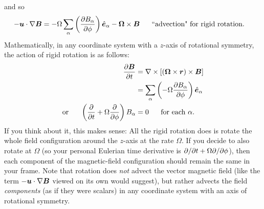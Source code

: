 \documentclass[12pt]{article}
\newcommand{\vecrot}{\bm{\Omega}}
\newcommand{\vecr}{\bm{r}}
\begin{document}
and so
\begin{align}
	-\vecu\dotgrad\vecb &= -\Omega\sum_\alpha\left(\pderiv{B_\alpha}{\phi}\right)\e_\alpha-\vecrot\times\vecb \five \text{``advection" for rigid rotation}.
\end{align}
Mathematically, in any coordinate system with a $z$-axis of rotational symmetry, the action of rigid rotation is as follows:
\begin{subequations}
\begin{align}
	\pderiv{\vecb}{t}&=\curl[(\vecrot\times\vecr)\times\vecb]\nonumber\\
	&= \sum_\alpha\left(-\Omega\pderiv{B_\alpha}{\phi}\right)\e_\alpha \label{eq:rottransport1}\\
	\orr \left(\pderiv{}{t}+\Omega\pderiv{}{\phi}\right)B_\alpha&=0\five\text{for each $\alpha$}.\label{eq:rottransport2}
\end{align}
\end{subequations}
If you think about it, this makes sense: All the rigid rotation does is rotate the whole field configuration around the $z$-axis at the rate $\Omega$. If you decide to also rotate at $\Omega$ (so your personal Eulerian time derivative is $\partial/\partial t+\Omega\partial/\partial\phi$), then each component of the magnetic-field configuration should remain the same in your frame. Note that rotation does \textit{not} advect the vector magnetic field (like the term $-\bm{u}\cdot\nabla\bm{B}$ viewed on its own would suggest), but rather advects the field \textit{components} (as if they were scalars) in any coordinate system with an axis of rotational symmetry. 
\end{document}
